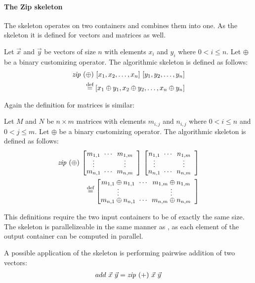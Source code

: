 \paragraph{The Zip skeleton}
The \zip skeleton operates on two containers and combines them into one.
As the \map skeleton it is defined for vectors and matrices as well.
\begin{definition}
  \label{definition:zip}
  Let $\vec{x}$ and $\vec{y}$ be vectors of size $n$ with elements $x_i$ and $y_i$ where $0 < i \leq n$.
  Let $\oplus$ be a binary customizing operator.
  The algorithmic skeleton \zip is defined as follows:
  \begin{equation*}
    \begin{split}
      \text{\textit{zip}}\ (\oplus)\ [x_1, x_2, \dots, x_n]\ [y_1, y_2, \dots, y_n]\\
      \stackrel{\textrm{\scriptsize def}}{=} [x_1 \oplus y_1, x_2 \oplus y_2, \dots, x_n \oplus y_n]
    \end{split}
  \end{equation*}
\end{definition}
\noindent
Again the definition for matrices is similar:
\begin{definition}
  \label{definition:zip:matrix}
  Let $M$ and $N$ be $n\times m$ matrices with elements $m_{i,j}$ and $n_{i,j}$ where $0 < i \leq n$ and $0 < j \leq m$.
  Let $\oplus$ be a binary customizing operator.
  The algorithmic skeleton \zip is defined as follows:
  \begin{equation*}
    \begin{split}
      \zip\ (\oplus)\ {\DottedMatrix{m_{1,1}}{m_{1,m}}{m_{n,1}}{m_{n,m}}}\
            {\DottedMatrix{n_{1,1}}{n_{1,m}}{n_{n,1}}{n_{n,m}}} \\
      \eqdef \DottedMatrix{m_{1,1} \oplus n_{1,1}}{m_{1,m} \oplus n_{1,m}}{m_{n,1} \oplus n_{n,1}}{m_{n,m} \oplus n_{n,m}}
    \end{split}
  \end{equation*}
\end{definition}
\noindent
This definitions require the two input containers to be of exactly the same size.
The \zip skeleton is parallelizeable in the same manner as \map, as each element of the output container can be computed in parallel.

A possible application of the \zip skeleton is performing pairwise addition of two vectors:
\begin{align*}
  add\ \vec{x}\ \vec{y} = \text{\textit{zip}}\ (+)\ \vec{x}\ \vec{y}
\end{align*}


